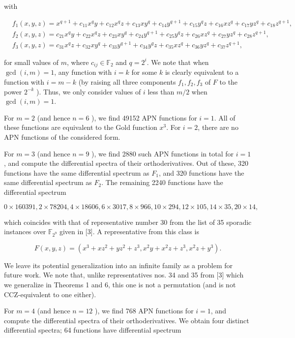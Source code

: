 \documentclass[10pt]{article}
\begin{document}
with

$$
\begin{aligned}
& f_{1}(x, y, z)=x^{q+1}+c_{11} x^{q} y+c_{12} x^{q} z+c_{13} x y^{q}+c_{14} y^{q+1}+c_{15} y^{q} z+c_{16} x z^{q}+c_{17} y z^{q}+c_{18} z^{q+1}, \\
& f_{2}(x, y, z)=c_{21} x^{q} y+c_{22} x^{q} z+c_{23} x y^{q}+c_{24} y^{q+1}+c_{25} y^{q} z+c_{26} x z^{q}+c_{27} y z^{q}+c_{28} z^{q+1}, \\
& f_{3}(x, y, z)=c_{31} x^{q} z+c_{32} x y^{q}+c_{33} y^{q+1}+c_{34} y^{q} z+c_{35} x z^{q}+c_{36} y z^{q}+c_{37} z^{q+1},
\end{aligned}
$$

for small values of $m$, where $c_{i j} \in \mathbb{F}_{2}$ and $q=2^{i}$. We note that when $\operatorname{gcd}(i, m)=1$, any function with $i=k$ for some $k$ is clearly equivalent to a function with $i=m-k$ (by raising all three components $f_{1}, f_{2}, f_{3}$ of $F$ to the power $2^{-k}$ ). Thus, we only consider values of $i$ less than $m / 2$ when $\operatorname{gcd}(i, m)=1$.

For $m=2$ (and hence $n=6$ ), we find 49152 APN functions for $i=1$. All of these functions are equivalent to the Gold function $x^{3}$. For $i=2$, there are no APN functions of the considered form.

For $m=3$ (and hence $n=9$ ), we find 2880 such APN functions in total for $i=1$, and compute the differential spectra of their orthoderivatives. Out of these, 320 functions have the same differential spectrum as $F_{1}$, and 320 functions have the same differential spectrum as $F_{2}$. The remaining 2240 functions have the differential spectrum

$$
0 \times 160391,2 \times 78204,4 \times 18606,6 \times 3017,8 \times 966,10 \times 294,12 \times 105,14 \times 35,20 \times 14,
$$

which coincides with that of representative number 30 from the list of 35 sporadic instances over $\mathbb{F}_{2^{9}}$ given in [3]. A representative from this class is

$$
F(x, y, z)=\left(x^{3}+x z^{2}+y z^{2}+z^{3}, x^{2} y+x^{2} z+z^{3}, x^{2} z+y^{3}\right) .
$$

We leave its potential generalization into an infinite family as a problem for future work. We note that, unlike representatives nos. 34 and 35 from [3] which we generalize in Theorems 1 and 6, this one is not a permutation (and is not CCZ-equivalent to one either).

For $m=4$ (and hence $n=12$ ), we find 768 APN functions for $i=1$, and compute the differential spectra of their orthoderivatives. We obtain four distinct differential spectra; 64 functions have differential spectrum
\end{document}
